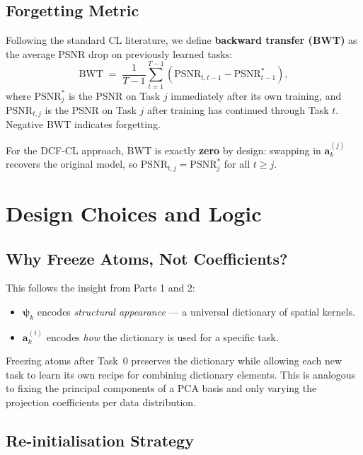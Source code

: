 \documentclass[11pt,letterpaper]{article}
\renewcommand{\a}{\mathbf{a}}
\newcommand{\psivec}{\boldsymbol{\psi}}
\begin{document}
\subsection{Forgetting Metric}

Following the standard CL literature, we define \textbf{backward transfer
(BWT)} as the average PSNR drop on previously learned tasks:
\begin{equation}
\text{BWT} \;=\; \frac{1}{T{-}1} \sum_{t=1}^{T-1}
\left( \text{PSNR}_{t, t{-}1} - \text{PSNR}^*_{t{-}1} \right),
\end{equation}
where $\text{PSNR}^*_j$ is the PSNR on Task $j$ immediately after its own
training, and $\text{PSNR}_{t,j}$ is the PSNR on Task $j$ after training has
continued through Task $t$.  Negative BWT indicates forgetting.

For the DCF-CL approach, BWT is exactly \textbf{zero} by design: swapping in
$\a_k^{(j)}$ recovers the original model, so
$\text{PSNR}_{t,j} = \text{PSNR}^*_j$ for all $t \geq j$.

\section{Design Choices and Logic}
\label{sec:design}

\subsection{Why Freeze Atoms, Not Coefficients?}

This follows the insight from Parts 1 and 2:
\begin{itemize}[leftmargin=*]
    \item $\psivec_k$ encodes \emph{structural appearance} --- a universal
          dictionary of spatial kernels.
    \item $\a_k^{(t)}$ encodes \emph{how} the dictionary is used for a
          specific task.
\end{itemize}
Freezing atoms after Task~0 preserves the dictionary while allowing each new
task to learn its own recipe for combining dictionary elements.  This is
analogous to fixing the principal components of a PCA basis and only varying
the projection coefficients per data distribution.

\subsection{Re-initialisation Strategy}
\end{document}
